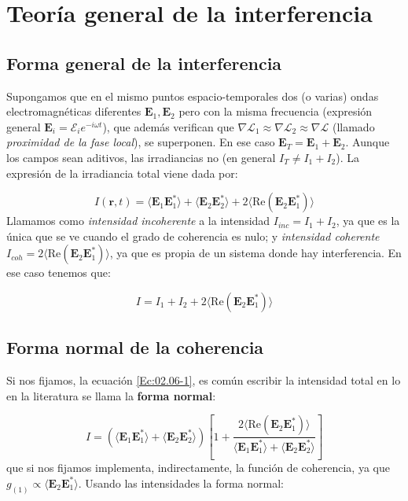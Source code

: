 \documentclass[12pt,a4paper]{book}
\numberwithin{equation}{section}
\numberwithin{figure}{section}
\newcommand{\parentesis}[1]{\left( #1  \right)}
\newcommand{\ccorchetes}[1]{\left[ #1  \right]}
\newcommand{\1}{_{(1)}}
\newcommand{\2}{_{(2)}}
\newcommand{\Real}{\mathrm{Re} }
\newcommand{\rn}{\mathbf{r}}
\newcommand{\En}{\mathbf{E}}
\newcommand{\Encal}{\boldsymbol{\mathcal{E}}}
\theoremstyle{definition}
\begin{document}
\section{Teoría general de la interferencia}

\subsection{Forma general de la interferencia}

Supongamos que en el mismo puntos espacio-temporales dos (o varias) ondas electromagnéticas diferentes $\En_1,\En_2$ pero con la misma frecuencia (expresión general $\En_i = \Encal_i e^{-i\omega t}$), que además verifican que $\nabla \mathcal{L}_1 \approx \nabla \mathcal{L}_2 \approx \nabla \mathcal{L}$ (llamado \textit{proximidad de la fase local}), se superponen. En ese caso $\En_T = \En_1 + \En_2$. Aunque los campos sean aditivos, las irradiancias no (en general $I_T \neq I_1 + I_2$). La expresión de la irradiancia total viene dada por:

\begin{equation}
I (\rn,t) = \langle \En_1 \En_1^* \rangle  + \langle \En_2 \En_2^* \rangle  + 2  \langle  \Real (\En_2 \En_1^*) \rangle  \label{Ec:02.06-1}
\end{equation}
Llamamos como \textit{intensidad incoherente} a la intensidad $I_{inc}=I_1+I_2$, ya que es la única que se ve cuando el grado de coherencia es nulo; y \textit{intensidad coherente} $I_{coh} = 2 \langle  \Real (\En_2 \En_1^*) \rangle  $, ya que es propia de un sistema donde hay interferencia. En ese caso tenemos que:

\begin{equation}
I = I_1 + I_2 + 2  \langle  \Real (\En_2 \En_1^*) \rangle 
\end{equation}

\subsection{Forma normal de la coherencia} 

Si nos fijamos, la ecuación \ref{Ec:02.06-1}, es común escribir la intensidad total en lo en la literatura se llama la \textbf{forma normal}:

\begin{equation}
I = \parentesis{\langle \En_1 \En_1^* \rangle  + \langle \En_2 \En_2^* \rangle } \ccorchetes{1 + \frac{2  \langle  \Real (\En_2 \En_1^*) \rangle  }{\langle \En_1 \En_1^* \rangle  + \langle \En_2 \En_2^* \rangle }}
\end{equation}
que si nos fijamos implementa, indirectamente, la función de coherencia, ya que $g\1 \propto \langle  \En_2 \En_1^* \rangle$. Usando las intensidades la forma normal:
\end{document}
